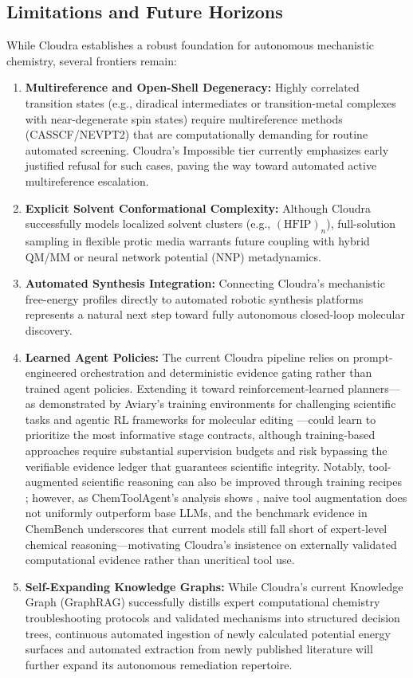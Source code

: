 \documentclass[10pt,twocolumn,letterpaper]{article}
\begin{document}
\subsection{Limitations and Future Horizons}
While Cloudra establishes a robust foundation for autonomous mechanistic chemistry, several frontiers remain:
\begin{enumerate}[leftmargin=*]
\item \textbf{Multireference and Open-Shell Degeneracy:} Highly correlated transition states (e.g., diradical intermediates or transition-metal complexes with near-degenerate spin states) require multireference methods (CASSCF/NEVPT2) that are computationally demanding for routine automated screening. Cloudra's Impossible tier currently emphasizes early justified refusal for such cases, paving the way toward automated active multireference escalation.
\item \textbf{Explicit Solvent Conformational Complexity:} Although Cloudra successfully models localized solvent clusters (e.g., $(\mathrm{HFIP})_n$), full-solution sampling in flexible protic media warrants future coupling with hybrid QM/MM or neural network potential (NNP) metadynamics.
\item \textbf{Automated Synthesis Integration:} Connecting Cloudra's mechanistic free-energy profiles directly to automated robotic synthesis platforms \cite{song2025chemagents,boiko2023autonomous} represents a natural next step toward fully autonomous closed-loop molecular discovery.
\item \textbf{Learned Agent Policies:} The current Cloudra pipeline relies on prompt-engineered orchestration and deterministic evidence gating rather than trained agent policies. Extending it toward reinforcement-learned planners---as demonstrated by Aviary's training environments for challenging scientific tasks \cite{narayanan2025aviary} and agentic RL frameworks for molecular editing \cite{yang2025molact}---could learn to prioritize the most informative stage contracts, although training-based approaches require substantial supervision budgets and risk bypassing the verifiable evidence ledger that guarantees scientific integrity. Notably, tool-augmented scientific reasoning can also be improved through training recipes \cite{ma2024sciagent}; however, as ChemToolAgent's analysis shows \cite{yu2025chemtoolagent}, naive tool augmentation does not uniformly outperform base LLMs, and the benchmark evidence in ChemBench \cite{mirza2025chembench} underscores that current models still fall short of expert-level chemical reasoning---motivating Cloudra's insistence on externally validated computational evidence rather than uncritical tool use.
\item \textbf{Self-Expanding Knowledge Graphs:} While Cloudra's current Knowledge Graph (GraphRAG) successfully distills expert computational chemistry troubleshooting protocols and validated mechanisms into structured decision trees, continuous automated ingestion of newly calculated potential energy surfaces and automated extraction from newly published literature will further expand its autonomous remediation repertoire.
\end{enumerate}
\end{document}
